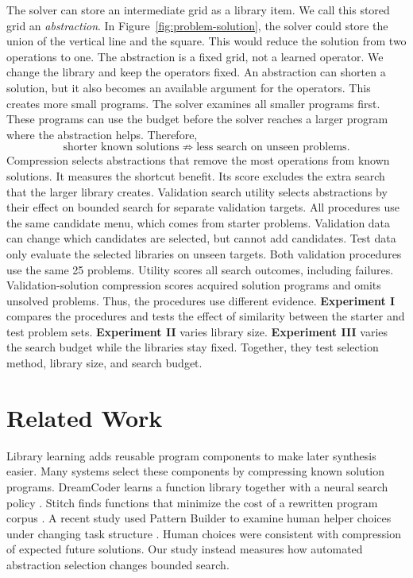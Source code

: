 \documentclass[10pt]{article}
\begin{document}
The solver can store an intermediate grid as a library item. We call this
stored grid an \emph{abstraction}. In Figure~\ref{fig:problem-solution}, the
solver could store the union of the vertical line and the square. This would
reduce the solution from two operations to one. The abstraction is a fixed
grid, not a learned operator. We change the library and keep the operators
fixed.
An abstraction can shorten a solution, but it also becomes an available
argument for the operators. This creates more small programs. The solver
examines all smaller programs first. These programs can use the budget before
the solver reaches a larger program where the abstraction helps. Therefore,
\[
  \text{shorter known solutions}
  \not\Rightarrow
  \text{less search on unseen problems}.
\]
Compression selects abstractions that remove the most operations from known
solutions. It measures the shortcut benefit. Its score excludes the extra search
that the larger library creates. Validation search utility selects abstractions by their
effect on bounded search for separate validation targets. All procedures use
the same candidate menu, which comes from starter problems. Validation data can
change which candidates are selected, but cannot add candidates. Test data only
evaluate the selected libraries on unseen targets.
Both validation procedures use the same 25 problems. Utility scores all search
outcomes, including failures. Validation-solution compression scores acquired
solution programs and omits unsolved problems. Thus, the procedures use
different evidence.
\textbf{Experiment I} compares the procedures and tests the effect of similarity
between the starter and test problem sets.
\textbf{Experiment II} varies library size. \textbf{Experiment III} varies the
search budget while the libraries stay fixed. Together, they test selection
method, library size, and search budget.
\section{Related Work}

Library learning adds reusable program components to make later synthesis
easier. Many systems select these components by compressing known solution
programs. DreamCoder learns a function library together with a neural search
policy \citep{ellis2021dreamcoder}. Stitch finds functions that minimize the cost
of a rewritten program corpus \citep{bowers2023stitch}. A recent study used
Pattern Builder to examine human helper choices under changing task structure
\citep{hernandezcano2026prospective}. Human choices were consistent with
compression of expected future solutions. Our study instead measures how
automated abstraction selection changes bounded search.
\end{document}
